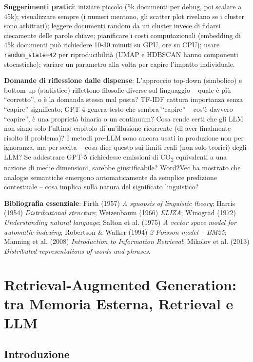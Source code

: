 \documentclass[12pt,a4paper]{article}
\begin{document}
\textbf{Suggerimenti pratici}: iniziare piccolo (5k documenti per debug, poi scalare a 45k); visualizzare sempre (i numeri mentono, gli scatter plot rivelano se i cluster sono arbitrari); leggere documenti random da un cluster invece di fidarsi ciecamente delle parole chiave; pianificare i costi computazionali (embedding di 45k documenti pu\`o richiedere 10-30 minuti su GPU, ore su CPU); usare \texttt{random\_state=42} per riproducibilit\`a (UMAP e HDBSCAN hanno componenti stocastiche); variare un parametro alla volta per capire l'impatto individuale.

\textbf{Domande di riflessione dalle dispense}: L'approccio top-down (simbolico) e bottom-up (statistico) riflettono filosofie diverse sul linguaggio -- quale \`e pi\`u ``corretto'', o \`e la domanda stessa mal posta? TF-IDF cattura importanza senza ``capire'' significato; GPT-4 genera testo che sembra ``capire'' -- cos'\`e davvero ``capire'', \`e una propriet\`a binaria o un continuum? Cosa rende certi che gli LLM non siano solo l'ultimo capitolo di un'illusione ricorrente (di aver finalmente risolto il problema)? I metodi pre-LLM sono ancora usati in produzione non per ignoranza, ma per scelta -- cosa dice questo sui limiti reali (non solo teorici) degli LLM? Se addestrare GPT-5 richiedesse emissioni di CO\textsubscript{2} equivalenti a una nazione di medie dimensioni, sarebbe giustificabile? Word2Vec ha mostrato che analogie semantiche emergono automaticamente da semplice predizione contestuale -- cosa implica sulla natura del significato linguistico?

\textbf{Bibliografia essenziale}: Firth (1957) \emph{A synopsis of linguistic theory}; Harris (1954) \emph{Distributional structure}; Weizenbaum (1966) \emph{ELIZA}; Winograd (1972) \emph{Understanding natural language}; Salton et al. (1975) \emph{A vector space model for automatic indexing}; Robertson \& Walker (1994) \emph{2-Poisson model -- BM25}; Manning et al. (2008) \emph{Introduction to Information Retrieval}; Mikolov et al. (2013) \emph{Distributed representations of words and phrases}.

\section{Retrieval-Augmented Generation: tra Memoria Esterna, Retrieval e LLM}

\subsection{Introduzione}
\end{document}
